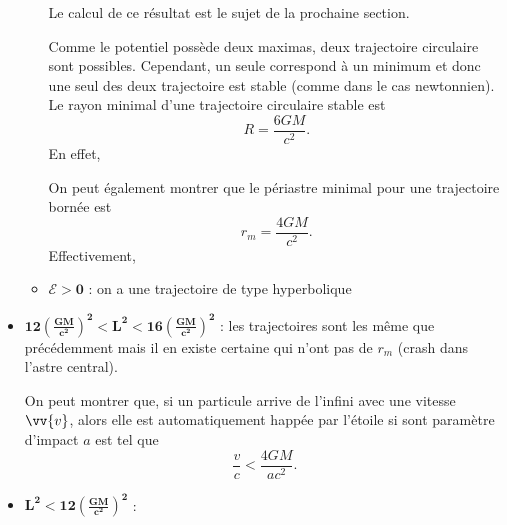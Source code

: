 \documentclass[a4paper,11pt]{report}
\begin{document}
\begin{itemize}[label = \textbullet]
\begin{itemize}[label = $\triangleright$]
                    Le calcul de ce résultat est le sujet de la prochaine section.
                    
                    
                    Comme le potentiel possède deux maximas, deux trajectoire circulaire sont possibles. Cependant, un seule correspond à un minimum et donc une seul des deux trajectoire est stable (comme dans le cas newtonnien). Le rayon minimal d'une trajectoire circulaire stable est
                    \begin{equation}
                        R = \frac{6GM}{c^2}.
                    \end{equation}
                    En effet,
                    \comp
                    
                    On peut également montrer que le périastre minimal pour une trajectoire bornée est
                    \begin{equation}
                        r_m = \frac{4GM}{c^2}.
                    \end{equation}
                    Effectivement,
                    \comp
                    
                    \item $\bm{\mathscr{E}>0}$ : on a une trajectoire de type hyperbolique 
                \end{itemize}
                \item $\bm{12\left( \frac{GM}{c^2} \right)^2<L^2<16\left( \frac{GM}{c^2} \right)^2}$ : les trajectoires sont les même que précédemment mais il en existe certaine qui n'ont pas de $r_m$ (crash dans l'astre central).
                
                
                On peut montrer que, si un particule arrive de l'infini avec une vitesse $\vv{v}$, alors elle est automatiquement happée par l'étoile si sont paramètre d'impact $a$ est tel que
                \begin{equation}
                    \frac{v}{c} <\frac{4GM}{ac^2}.
                \end{equation}
                
                \comp
                
                \item $\bm{L^2<12\left( \frac{GM}{c^2} \right)^2}$ : 
                
                
            \end{itemize}
    
\end{document}
